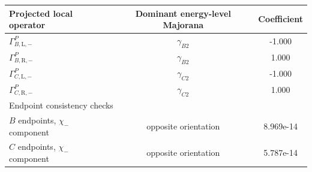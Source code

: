 \begin{tabular}{lcc}
\hline
Projected local operator & Dominant energy-level Majorana & Coefficient \\
\hline
$\Gamma_{B,\mathrm{L},-}^{P}$ & $\gamma_{B2}$ & -1.000 \\
$\Gamma_{B,\mathrm{R},-}^{P}$ & $\gamma_{B2}$ & 1.000 \\
$\Gamma_{C,\mathrm{L},-}^{P}$ & $\gamma_{C2}$ & -1.000 \\
$\Gamma_{C,\mathrm{R},-}^{P}$ & $\gamma_{C2}$ & 1.000 \\
\hline
\multicolumn{3}{l}{Endpoint consistency checks} \\
\hline
$B$ endpoints, $\chi_-$ component & opposite orientation & 8.969e-14 \\
$C$ endpoints, $\chi_-$ component & opposite orientation & 5.787e-14 \\
\hline
\end{tabular}
